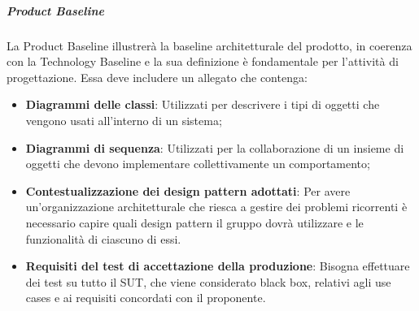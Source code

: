 \subparagraph*{Product Baseline}
La Product Baseline illustrerà la baseline architetturale del prodotto, in coerenza con la Technology Baseline e la sua definizione è fondamentale per l'attività di progettazione.
Essa deve includere un allegato che contenga:
\begin{itemize}
	\item \textbf{Diagrammi delle classi}: Utilizzati per descrivere i tipi di oggetti che vengono usati all'interno di un sistema;
	\item \textbf{Diagrammi di sequenza}: Utilizzati per la collaborazione di un insieme di oggetti che devono implementare collettivamente un comportamento;
	\item \textbf{Contestualizzazione dei design pattern adottati}: Per avere un'organizzazione architetturale che riesca a gestire dei problemi ricorrenti è necessario capire quali design pattern il gruppo dovrà utilizzare e le funzionalità di ciascuno di essi.	
	\item \textbf{Requisiti del test di accettazione della produzione}: Bisogna effettuare dei test su tutto il SUT, che viene considerato black box, relativi agli use cases e ai requisiti concordati con il proponente.
\end{itemize}